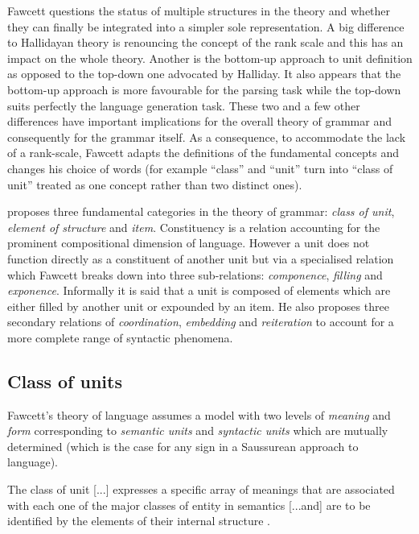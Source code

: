    Fawcett questions the status of multiple structures in the theory and whether they can finally be integrated into a simpler sole representation. A big difference to Hallidayan theory is renouncing the concept of the rank scale and this has an impact on the whole theory. Another is the bottom-up approach to unit definition as opposed to the top-down one advocated by Halliday. It also appears that the bottom-up approach is more favourable for the parsing task while the top-down suits perfectly the language generation task. These two and a few other differences have important implications for the overall theory of grammar and consequently for the grammar itself. As a consequence, to accommodate the lack of a rank-scale, Fawcett adapts the definitions of the fundamental concepts and changes his choice of words (for example ``class'' and ``unit'' turn into ``class of unit'' treated as one concept rather than two distinct ones).
    
    \citet{Fawcett2000} proposes three fundamental categories in the theory of grammar: \textit{class of unit}, \textit{element of structure} and \textit{item}. Constituency is a relation accounting for the prominent compositional dimension of language. However a unit does not function directly as a constituent of another unit but via a specialised relation which Fawcett breaks down into three sub-relations: \textit{componence}, \textit{filling} and \textit{exponence}. Informally it is said that a unit is composed of elements which are either filled by another unit or expounded by an item. He also proposes three secondary relations of \textit{coordination}, \textit{embedding} and \textit{reiteration} to account for a more complete range of syntactic phenomena.
    
    \subsection{Class of units}
    Fawcett's theory of language assumes a model with two levels of \textit{meaning} and \textit{form} corresponding to \textit{semantic units} and \textit{syntactic units} which are mutually determined (which is the case for any sign in a Saussurean approach to language). 
    
    \begin{definition}\label{def:class2}
    	The class of unit [...] expresses a specific array of meanings that are associated with each one of the major classes of entity in semantics [...and] are to be identified by the elements of their internal structure \citep[195]{Fawcett2000}. 
    \end{definition}
    
